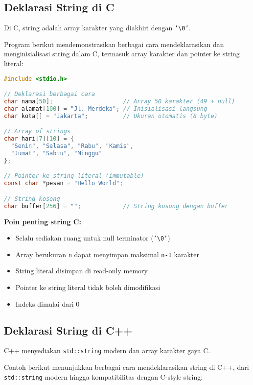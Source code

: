 \documentclass[../main.tex]{subfiles}
\begin{document}
\subsection{Deklarasi String di C}

Di C, string adalah array karakter yang diakhiri dengan \texttt{'\textbackslash 0'}.

Program berikut mendemonstrasikan berbagai cara mendeklarasikan dan menginisialisasi string dalam C, termasuk array karakter dan pointer ke string literal:

\begin{lstlisting}[language=C, caption={Deklarasi string di C}]
#include <stdio.h>

// Deklarasi berbagai cara
char nama[50];                    // Array 50 karakter (49 + null)
char alamat[100] = "Jl. Merdeka"; // Inisialisasi langsung
char kota[] = "Jakarta";          // Ukuran otomatis (8 byte)

// Array of strings
char hari[7][10] = {
  "Senin", "Selasa", "Rabu", "Kamis",
  "Jumat", "Sabtu", "Minggu"
};

// Pointer ke string literal (immutable)
const char *pesan = "Hello World";

// String kosong
char buffer[256] = "";            // String kosong dengan buffer
\end{lstlisting}

\textbf{Poin penting string C:}
\begin{itemize}
  \item Selalu sediakan ruang untuk null terminator (\texttt{'\textbackslash 0'})
  \item Array berukuran \texttt{n} dapat menyimpan maksimal \texttt{n-1} karakter
  \item String literal disimpan di read-only memory
  \item Pointer ke string literal tidak boleh dimodifikasi
  \item Indeks dimulai dari 0
\end{itemize}

\subsection{Deklarasi String di C++}

C++ menyediakan \texttt{std::string} modern dan array karakter gaya C.

Contoh berikut menunjukkan berbagai cara mendeklarasikan string di C++, dari \texttt{std::string} modern hingga kompatibilitas dengan C-style string:
\end{document}
